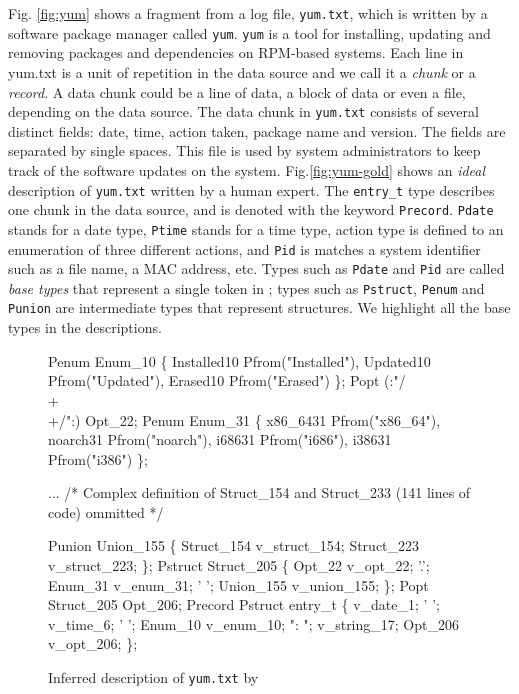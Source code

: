 Fig. \ref{fig:yum} shows a fragment from a log file, {\tt yum.txt},
which is written by a software package manager called {\tt yum}. {\tt yum} 
is a tool for installing, updating and removing packages and dependencies
on RPM-based systems. 
Each line in yum.txt is a unit of
repetition in the data source and we call it a {\em chunk} or
a {\em record}. A data chunk could be a line of data, a block of data or
even a file, depending on the data source.
The data chunk in {\tt yum.txt} consists of several distinct fields: 
date, time, action taken,
package name and version. The fields are separated by single spaces.
This file is used by system administrators to keep track of the
software updates on the system. 
Fig.\ref{fig:yum-gold} shows an {\em ideal} \pads{} description of
{\tt yum.txt} written by a human expert.
The {\tt entry\_t} type describes one chunk in the data source, and is
denoted with the keyword {\tt Precord}.
{\tt Pdate} stands for a date type, {\tt Ptime} stands for a time type,
action type is defined to an enumeration of three different actions,
and {\tt Pid} is matches a system identifier such as a file
name, a MAC address, etc. Types such as {\tt Pdate} and {\tt Pid}
are called {\em base types} that represent a single token 
in \pads{}; types such as {\tt Pstruct}, {\tt Penum} and {\tt Punion} are 
intermediate types that represent
structures. We highlight all the base types in the \pads{} descriptions. 
 
\begin{figure}[t]
\begin{centercode}
Penum Enum_10 \{
  Installed10 Pfrom("Installed"),
  Updated10 Pfrom("Updated"),
  Erased10 Pfrom("Erased")
\};
Popt (:"/\\+\\+/":) Opt_22;
Penum Enum_31 \{
  x86_6431 Pfrom("x86_64"),
  noarch31 Pfrom("noarch"),
  i68631 Pfrom("i686"),
  i38631 Pfrom("i386")
\};

... /* Complex definition of Struct_154 and Struct_233 
       (141 lines of code) ommitted */

Punion Union_155 \{
  Struct_154  v_struct_154;
  Struct_223  v_struct_223;
\};
Pstruct Struct_205 \{
  Opt_22  v_opt_22;
  '.';
  Enum_31  v_enum_31;
  ' ';
  Union_155  v_union_155;
\};
Popt Struct_205 Opt_206;
Precord Pstruct entry_t \{
    v_date_1;
  ' ';
    v_time_6;
  ' ';
  Enum_10  v_enum_10;
  ": ";
   v_string_17;
  Opt_206  v_opt_206;
\};
\end{centercode}
\caption{Inferred \pads{} description of {\tt yum.txt} by \learnpads}\label{fig:yum-bad}
\end{figure}

